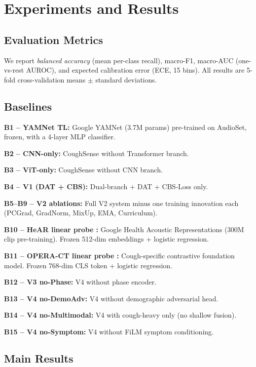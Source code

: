 \documentclass[journal]{IEEEtran}
\begin{document}
\section{Experiments and Results}
\label{sec:results}

\subsection{Evaluation Metrics}

We report \emph{balanced accuracy} (mean per-class recall),
macro-F1, macro-AUC (one-vs-rest AUROC), and expected calibration
error (ECE, 15 bins). All results are 5-fold cross-validation
means $\pm$ standard deviations.

\subsection{Baselines}

\textbf{B1 -- YAMNet TL:} Google YAMNet (3.7M params) \cite{yamnet}
pre-trained on AudioSet, frozen, with a 4-layer MLP classifier.

\textbf{B2 -- CNN-only:} CoughSense without Transformer branch.

\textbf{B3 -- ViT-only:} CoughSense without CNN branch.

\textbf{B4 -- V1 (DAT + CBS):} Dual-branch + DAT + CBS-Loss only.

\textbf{B5--B9 -- V2 ablations:} Full V2 system minus one training
innovation each (PCGrad, GradNorm, MixUp, EMA, Curriculum).

\textbf{B10 -- HeAR linear probe \cite{hear2024}:} Google Health
Acoustic Representations (300M clip pre-training). Frozen 512-dim
embeddings + logistic regression.

\textbf{B11 -- OPERA-CT linear probe \cite{opera2023}:}
Cough-specific contrastive foundation model. Frozen 768-dim CLS
token + logistic regression.

\textbf{B12 -- V3 no-Phase:} V4 without phase encoder.

\textbf{B13 -- V4 no-DemoAdv:} V4 without demographic adversarial head.

\textbf{B14 -- V4 no-Multimodal:} V4 with cough-heavy only (no shallow fusion).

\textbf{B15 -- V4 no-Symptom:} V4 without FiLM symptom conditioning.

\subsection{Main Results}
\end{document}
